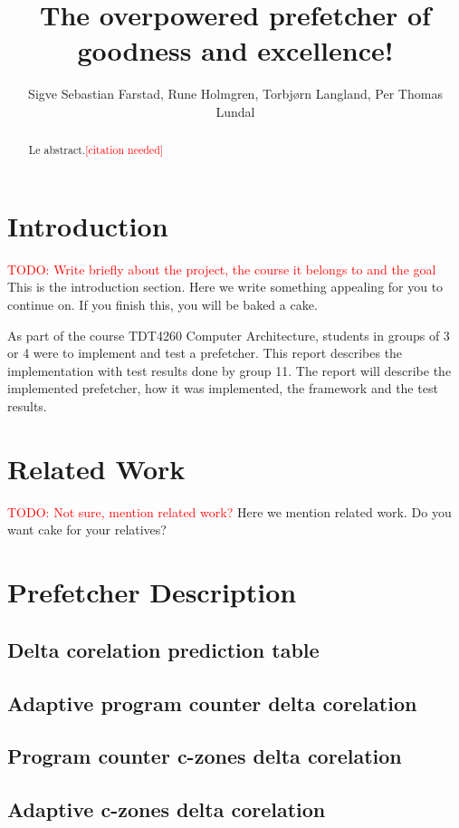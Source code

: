 \documentclass[a4paper]{IEEEtran}
\title{The overpowered prefetcher of goodness and excellence!}
\author{
    Sigve Sebastian Farstad,
    Rune Holmgren,
    Torbjørn Langland,
    Per Thomas Lundal
}
\newcommand\TODO[1]{\textcolor{red}{TODO:#1}}
\newcommand\todo[1]{\TODO{#1}}
\newcommand\cn{\textcolor{red}{[citation needed]}}
\begin{document}
\maketitle

\begin{abstract}
    Le abstract.\cn
\end{abstract}

\section{Introduction}

\todo{ Write briefly about the project, the course it belongs to and the goal}
This is the introduction section.
Here we write something appealing for you to continue on.
If you finish this, you will be baked a cake.

As part of the course TDT4260 Computer Architecture, students in groups of 3 or 4 were to implement and test a prefetcher.
This report describes the implementation with test results done by group 11.
The report will describe the implemented prefetcher, how it was implemented, the framework and the test results.

\section{Related Work}

\todo{ Not sure, mention related work?}
Here we mention related work. Do you want cake for your relatives?

\section{Prefetcher Description}

\subsection{Delta corelation prediction table}

\subsection{Adaptive program counter delta corelation}

\subsection{Program counter c-zones delta corelation}

\subsection{Adaptive c-zones delta corelation}
\end{document}

